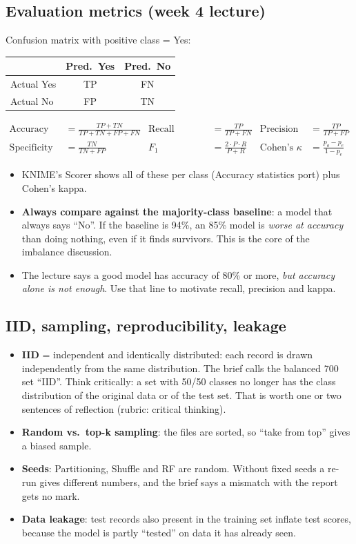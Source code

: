 \documentclass[11pt,a4paper]{article}
\begin{document}
\subsection{Evaluation metrics (week 4 lecture)}
Confusion matrix with positive class = Yes:\quad
\begin{tabular}{@{}lcc@{}}\toprule & Pred.\ Yes & Pred.\ No\\\midrule Actual Yes & TP & FN\\ Actual No & FP & TN\\\bottomrule\end{tabular}
\begin{align*}
\text{Accuracy} &= \tfrac{TP+TN}{TP+TN+FP+FN} &
\text{Recall (TPR, sensitivity)} &= \tfrac{TP}{TP+FN} &
\text{Precision} &= \tfrac{TP}{TP+FP}\\
\text{Specificity (TNR)} &= \tfrac{TN}{TN+FP} &
F_1 &= \tfrac{2\cdot P \cdot R}{P+R} &
\text{Cohen's }\kappa &= \tfrac{p_o - p_e}{1-p_e}
\end{align*}
\begin{itemize}
  \item KNIME's Scorer shows all of these per class (Accuracy statistics port) plus Cohen's kappa.
  \item \textbf{Always compare against the majority-class baseline}: a model that always says ``No''.
        If the baseline is 94\%, an 85\% model is \emph{worse at accuracy} than doing nothing, even if
        it finds survivors. This is the core of the imbalance discussion.
  \item The lecture says a good model has accuracy of 80\% or more, \emph{but accuracy alone is not
        enough}. Use that line to motivate recall, precision and kappa.
\end{itemize}

\subsection{IID, sampling, reproducibility, leakage}
\begin{itemize}
  \item \textbf{IID} = independent and identically distributed: each record is drawn independently
        from the same distribution. The brief calls the balanced 700 set ``IID''. Think critically: a
        set with 50/50 classes no longer has the class distribution of the original data or of the
        test set. That is worth one or two sentences of reflection (rubric: critical thinking).
  \item \textbf{Random vs.\ top-k sampling}: the files are sorted, so ``take from top'' gives a biased sample.
  \item \textbf{Seeds}: Partitioning, Shuffle and RF are random. Without fixed seeds a re-run gives
        different numbers, and the brief says a mismatch with the report gets no mark.
  \item \textbf{Data leakage}: test records also present in the training set inflate test scores,
        because the model is partly ``tested'' on data it has already seen.
\end{itemize}
\end{document}
